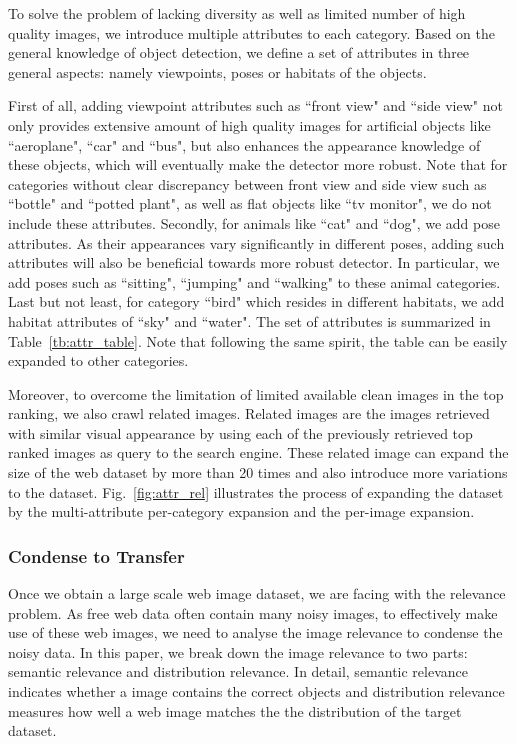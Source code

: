 \documentclass[10pt,twocolumn,letterpaper]{article}
\begin{document}
To solve the problem of lacking diversity as well as limited number of high quality images, we introduce multiple attributes to each category. Based on the general knowledge of object detection, we define a set of attributes in three general aspects: namely viewpoints, poses or habitats of the objects. 

First of all, adding viewpoint attributes such as ``front view" and ``side view" not only provides extensive amount of high quality images for artificial objects like ``aeroplane", ``car" and ``bus", but also enhances the appearance knowledge of these objects, which will eventually make the detector more robust. Note that for categories without clear discrepancy between front view and side view such as ``bottle" and ``potted plant", as well as flat objects like ``tv monitor", we do not include these attributes. Secondly, for animals like ``cat" and ``dog", we add pose attributes. As their appearances vary significantly in different poses, adding such attributes will also be beneficial towards more robust detector. In particular, we add poses such as  ``sitting", ``jumping" and ``walking" to these animal categories. Last but not least, for category ``bird" which resides in different habitats, we add habitat attributes of ``sky" and ``water". The set of attributes is summarized in Table~\ref{tb:attr_table}. Note that following the same spirit, the table can be easily expanded to other categories. 



Moreover, to overcome the limitation of limited available clean images in the top ranking, we also crawl related images. Related images are the images retrieved with similar visual appearance by using each of the previously retrieved top ranked images as query to the search engine. These related image can expand the size of the web dataset by more than 20 times and also introduce more variations to the dataset. Fig.~\ref{fig:attr_rel} illustrates the process of expanding the dataset by the multi-attribute per-category expansion and the per-image expansion.



\subsubsection{Condense to Transfer}
\label{sec:condense}
Once we obtain a large scale web image dataset, we are facing with the relevance problem. As free web data often contain many noisy images, to effectively make use of these web images, we need to analyse the image relevance to condense the noisy data. In this paper, we break down the image relevance to two parts: semantic relevance and distribution relevance. In detail, semantic relevance indicates whether a image contains the correct objects and distribution relevance measures how well a web image matches the the distribution of the target dataset.
\end{document}
